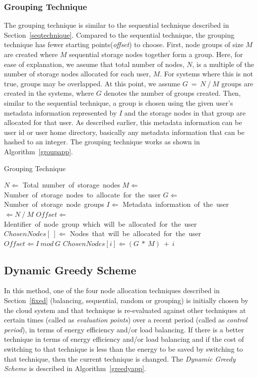 \documentclass[preprint,12pt]{elsarticle}
\begin{document}
\subsubsection{Grouping Technique}
The grouping technique is similar to the sequential technique described in Section~\ref{seqtechnique}.
Compared to the sequential technique, the grouping technique has fewer starting points(\textit{offset})
to choose. %
First, node groups of size $M$ are
created where $M$ sequential storage nodes together form a
group. Here, for ease of explanation, we 
assume that total number of nodes, $N$, is a multiple of the number of storage nodes allocated
for each user, $M$. For systems where this is not true, groups may be overlapped. At this point,
we assume $G\ =\ N\ /\ M$ groups are created in the systems, where $G$ denotes the number of groups created. 
Then, similar to the sequential technique, a group is chosen using the given user's metadata information
represented by $I$ and the storage nodes in that group are allocated for that user. As described
earlier, this metadata information can be user id or user home directory, basically any metadata
information that can be hashed to an integer. The grouping technique works as shown in
Algorithm~\ref{groupapp}.

\begin{algorithm}[!htbp]
\caption{Grouping Technique}
\label{groupapp}
\begin{algorithmic}[1]
    \STATE $N \Leftarrow$ Total\ number\ of\ storage\ nodes
    \STATE $M \Leftarrow$ Number\ of\ storage\ nodes\ to\ allocate\ for\ the\ user
    \STATE $G \Leftarrow$ Number\ of\ storage\ node\ groups
    \STATE $I \Leftarrow$ Metadata\ information\ of\ the\ user $\Leftarrow N\ /\ M$
    \STATE $Offset \Leftarrow$ Identifier\ of\ node\ group\ which\ will\ be\ allocated\ for\ the\ user
    \STATE $ChosenNodes[\ ] \Leftarrow$ Nodes\ that\ will\ be\ allocated\ for\ the\ user
    \STATE $Offset \Leftarrow I\ mod\ G$
        \STATE $ChosenNodes[i] \Leftarrow (G\ *\ M)\ +\ i$
    \ENDFOR
\end{algorithmic}
\end{algorithm}

\subsection{Dynamic Greedy Scheme}
\label{greedy}
In this method, one of the four node allocation techniques described in Section~\ref{fixed} (balancing,
sequential, random or grouping) is initially chosen by the cloud system and that technique is re-evaluated
against other techniques at certain times (called as \textit{evaluation points}) over a recent period (called
as \textit{control period}), in terms of energy efficiency and/or load balancing. If there is a better
technique in terms of energy efficiency and/or load balancing and if the cost of switching to that technique
is less than the energy to be saved by switching to that technique, then the current technique is changed.
The \textit{Dynamic Greedy Scheme} is described in Algorithm~\ref{greedyapp}.
\end{document}
